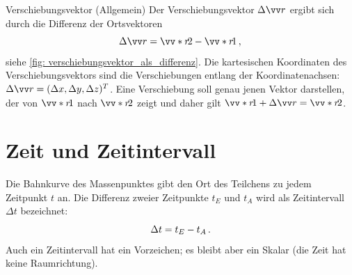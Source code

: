 \begin{rememberbox}{Verschiebungsvektor (Allgemein)}
    Der Verschiebungsvektor $\Delta\ivec{r}$ ergibt sich durch die Differenz der Ortsvektoren \begin{equation}
        \Delta\ivec{r}=\ivecS{r}{2}-\ivecS{r}{1}\mComma
    \end{equation}
    siehe \cref{fig: verschiebungsvektor_als_differenz}. Die kartesischen Koordinaten des Verschiebungsvektors sind die Verschiebungen entlang der Koordinatenachsen: $\Delta\ivec{r} = \inlrowThree{\Delta x}{\Delta y}{\Delta z}^T$. Eine Verschiebung soll genau jenen Vektor darstellen, der von $\ivecS{r}{1}$ nach $\ivecS{r}{2}$ zeigt und daher gilt $\ivecS{r}{1} + \Delta\ivec{r} = \ivecS{r}{2}$.
\end{rememberbox}


\section{Zeit und Zeitintervall}\label{sec: Zeit_Zeitintervall}
Die Bahnkurve des Massenpunktes gibt den Ort des Teilchens zu jedem Zeitpunkt $t$ an. Die Differenz zweier Zeitpunkte $t_E$ und $t_A$ wird als Zeitintervall $\Delta t$ bezeichnet:
\begin{equation}
    \Delta t=t_{E} - t_{A}\,.
\end{equation}
Auch ein Zeitintervall hat ein Vorzeichen; es bleibt aber ein Skalar (die Zeit hat keine Raumrichtung). 

